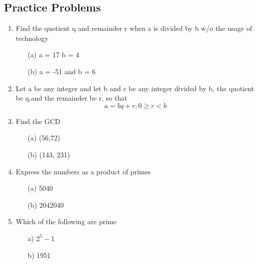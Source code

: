 \documentclass[12pt]{article}
\begin{document}
\subsection*{Practice Problems}
\begin{enumerate}
    \item Find the quotient q and remainder r when a is divided by b w/o the usage of technology
    \begin{itemize}
        \item[(a)] a = 17 b = 4
        \vspace{2cm}
        \item[(b)] a = -51 and b = 6 
       \vspace{2cm}
        
    \end{itemize}
    \item Let a be any integer and let b and c be any integer divided by b, the quotient be q,and the remainder be r, so that 
    \begin{equation*}
        a = bq + r;  0 \geq r < b
    \end{equation*}
   \clearpage
    \item Find the GCD 
    \begin{itemize}
        \item[(a)] (56,72) 
    \vspace{2cm}
        \item[(b)] (143, 231) 
     \vspace{2cm}
    \end{itemize}
   \item Express the numbers as a product of primes 
   \begin{itemize}
       \item[(a)] 5040 
       \vspace{3cm}
       \item[(b)] 2042040
   \end{itemize}
   \item Which of the following are prime 
   \begin{itemize}
       \item[a)] $2^{5} - 1$
        \vspace{3cm}
       \item[b)] 1951 
   
       
   \end{itemize}
\end{enumerate}
\end{document}
